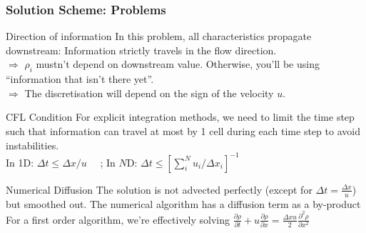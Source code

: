 \begin{frame}
	\frametitle{Solution Scheme: Problems}
	
	\begin{block}{Direction of information}
		In this problem, all characteristics propagate downstream: Information strictly travels in the flow direction.\\
		$\Rightarrow$ $\rho_i$ mustn't depend on downstream value. Otherwise, you'll be using ``information that isn't there yet''.\\
		$\Rightarrow$ The discretisation will depend on the sign of the velocity $u$.
	\end{block}

	\begin{block}{CFL Condition}
		For explicit integration methods, we need to limit the time step such that information can travel at most by 1 cell during each time step to avoid instabilities.\\
		In 1D: $\Delta t \leq \Delta x / u\quad$ ;  In $N$D: $\Delta t \leq [\sum_i^N u_i / \Delta x_i ]^{-1}$
	\end{block}

	\begin{block}{Numerical Diffusion}
		The solution is not advected perfectly (except for $\Delta t = \frac{\Delta x}{u}$) but smoothed out. The numerical algorithm has a diffusion term as a by-product For a first order algorithm, we're effectively solving $\frac{\partial \rho}{\partial t} + u \frac{\partial \rho}{\partial x} = \frac{\Delta x u}{2}\frac{\partial^2 \rho}{\partial x^2}$
	\end{block}

\end{frame}







